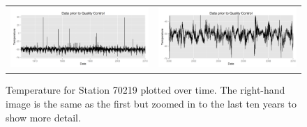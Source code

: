 \documentclass[12pt]{article}
\begin{document}

\clearpage
\begin{figure}[h!]
	\centering
	\begin{tabular}{cc}
		\includegraphics[width=.5\textwidth]{70219_Data_Unhomogenized_no_vlines} &
		\includegraphics[width=.5\textwidth]{70219_Data_Unhomogenized_zoomed_no_vlines}
	\end{tabular}
	\caption{Temperature for Station 70219 plotted over time.  The right-hand image is the same as the first but zoomed in to the last ten years to show more detail.}
	\label{fig:BasicTS}
\end{figure}
\end{document}
